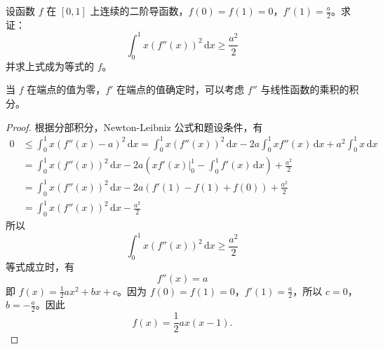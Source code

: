 \documentclass[../../main.tex]{subfiles}
\begin{document}
\begin{example}
设函数 \( f \) 在 \([0,1]\) 上连续的二阶导函数，\( f(0) = f(1) = 0 \)，\( f'(1) = \frac{a}{2} \)。求证：
\[
\int_{0}^{1} x(f''(x))^2 \, \mathrm{d}x \geqslant \frac{a^2}{2}
\]
并求上式成为等式的 \( f \)。
\end{example}
\begin{remark}
当 \( f \) 在端点的值为零，\( f' \) 在端点的值确定时，可以考虑 \( f'' \) 与线性函数的乘积的积分。
\end{remark}
\begin{proof}
根据分部积分，Newton-Leibniz 公式和题设条件，有
\begin{align*}
0 &\leqslant \int_{0}^{1} x(f''(x) - a)^2 \, \mathrm{d}x = \int_{0}^{1} x(f''(x))^2 \, \mathrm{d}x - 2a \int_{0}^{1} x f''(x) \, \mathrm{d}x + a^2 \int_{0}^{1} x \, \mathrm{d}x \\
&= \int_{0}^{1} x(f''(x))^2 \, \mathrm{d}x - 2a \left( x f'(x)\big|_{0}^{1} - \int_{0}^{1} f'(x) \, \mathrm{d}x \right) + \frac{a^2}{2} \\
&= \int_{0}^{1} x(f''(x))^2 \, \mathrm{d}x - 2a \left( f'(1) - f(1) + f(0) \right) + \frac{a^2}{2} \\
&= \int_{0}^{1} x(f''(x))^2 \, \mathrm{d}x - \frac{a^2}{2}
\end{align*}
所以
\[
\int_{0}^{1} x(f''(x))^2 \, \mathrm{d}x \geqslant \frac{a^2}{2}
\]
等式成立时，有
\[
f''(x) = a
\]
即 \( f(x) = \frac{1}{2} a x^2 + b x + c \)。因为 \( f(0) = f(1) = 0 \)，\( f'(1) = \frac{a}{2} \)，所以 \( c = 0 \)，\( b = -\frac{a}{2} \)。因此
\[
f(x) = \frac{1}{2} a x(x - 1).
\]

\end{proof}
\end{document}
